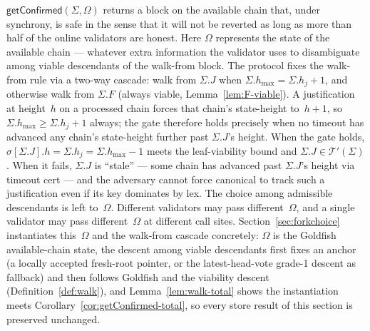 \ifx\litemode\undefined\documentclass{article}\fi
\newcommand{\hmax}{\ensuremath{h_{\max}}\xspace}
\newcommand{\viableTree}{\ensuremath{\mathcal{T}'}}
\newcommand{\getConfirmed}{\textsf{getConfirmed}\xspace}
\theoremstyle{plain}
\theoremstyle{definition}
\theoremstyle{remark}
\begin{document}
$\getConfirmed(\Sigma, \Omega)$ returns a block on the available chain that, under synchrony, is safe in the sense that it will not be reverted as long as more than half of the online validators are honest.
Here $\Omega$ represents the state of the available chain --- whatever extra information the validator uses to disambiguate among viable descendants of the walk-from block.
The protocol fixes the walk-from rule via a two-way cascade: walk from $\Sigma.J$ when $\Sigma.\hmax = \Sigma.h_j + 1$, and otherwise walk from $\Sigma.F$ (always viable, Lemma~\ref{lem:F-viable}).
A justification at height~$h$ on a processed chain forces that chain's state-height to~$h + 1$, so $\Sigma.\hmax \geq \Sigma.h_j + 1$ always; the gate therefore holds precisely when no timeout has advanced any chain's state-height further past $\Sigma.J$'s height.
When the gate holds, $\sigma[\Sigma.J].h = \Sigma.h_j = \Sigma.\hmax - 1$ meets the leaf-viability bound and $\Sigma.J \in \viableTree(\Sigma)$.
When it fails, $\Sigma.J$ is ``stale'' --- some chain has advanced past $\Sigma.J$'s height via timeout cert --- and the adversary cannot force canonical to track such a justification even if its key dominates by lex.
The choice among admissible descendants is left to~$\Omega$.
Different validators may pass different~$\Omega$, and a single validator may pass different~$\Omega$ at different call sites.
Section~\ref{sec:forkchoice} instantiates this~\(\Omega\) and the walk-from cascade concretely: \(\Omega\) is the Goldfish available-chain state, the descent among viable descendants first fixes an anchor (a locally accepted fresh-root pointer, or the latest-head-vote grade-1 descent as fallback) and then follows Goldfish and the viability descent (Definition~\ref{def:walk}), and Lemma~\ref{lem:walk-total} shows the instantiation meets Corollary~\ref{cor:getConfirmed-total}, so every store result of this section is preserved unchanged.
\end{document}
